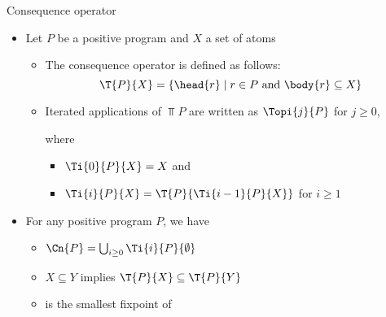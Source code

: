 \begin{frame}{Consequence operator}

  \begin{itemize}
  \item Let $P$ be a positive program and $X$ a set of atoms

    \begin{itemize}
    \item<1->
      The \alert{consequence operator}  is defined as follows:
      \[
      \T{P}{X} = \{  \head{r}\mid r\in P\text{ and }\body{r}\subseteq X  \}
      \]
    \item<2->
      Iterated applications of $\Top{P}$ are written as $\Topi{j}{P}$ for
      $j\geq 0$,

      where
      \begin{itemize}
      \item \small
        \(
        \Ti{0}{P}{X}=X
        \)
        and
        \smallskip
      \item \small
        \(
        \Ti{i}{P}{X}=\T{P}{\Ti{i-1}{P}{X}}
        \)
        for $i\geq 1$
      \end{itemize}
    \end{itemize}
    \medskip
  \item<3-> For any positive program $P$, we have
    \begin{itemize}\itemsep .5ex
    \item $\Cn{P}=\bigcup_{i\geq 0}\Ti{i}{P}{\emptyset}$
    \item $X\subseteq Y$ implies $\T{P}{X}\subseteq\T{P}{Y}$
    \item {} is the smallest fixpoint of 
    \end{itemize}
  \end{itemize}

\end{frame}

